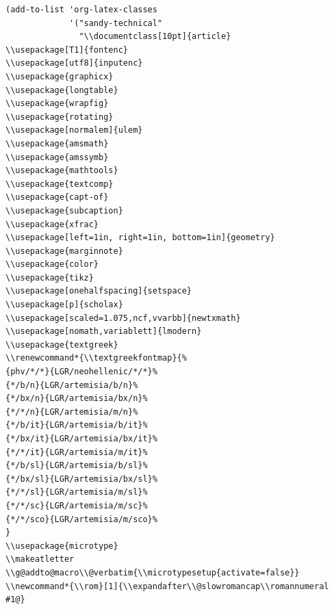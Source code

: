 \documentclass[10pt]{article}
\makeatletter
\renewcommand*{\textgreekfontmap}{%
{phv/*/*}{LGR/neohellenic/*/*}%
{*/b/n}{LGR/artemisia/b/n}%
{*/bx/n}{LGR/artemisia/bx/n}%
{*/*/n}{LGR/artemisia/m/n}%
{*/b/it}{LGR/artemisia/b/it}%
{*/bx/it}{LGR/artemisia/bx/it}%
{*/*/it}{LGR/artemisia/m/it}%
{*/b/sl}{LGR/artemisia/b/sl}%
{*/bx/sl}{LGR/artemisia/bx/sl}%
{*/*/sl}{LGR/artemisia/m/sl}%
{*/*/sc}{LGR/artemisia/m/sc}%
{*/*/sco}{LGR/artemisia/m/sco}%
}
\newcommand*{\rom}[1]{\expandafter\@slowromancap\romannumeral #1@}
\makeatother
\begin{document}
\begin{verbatim}
(add-to-list 'org-latex-classes
             '("sandy-technical"
               "\\documentclass[10pt]{article}
\\usepackage[T1]{fontenc}
\\usepackage[utf8]{inputenc}
\\usepackage{graphicx}
\\usepackage{longtable}
\\usepackage{wrapfig}
\\usepackage{rotating}
\\usepackage[normalem]{ulem}
\\usepackage{amsmath}
\\usepackage{amssymb}
\\usepackage{mathtools}
\\usepackage{textcomp}
\\usepackage{capt-of}
\\usepackage{subcaption}
\\usepackage{xfrac}
\\usepackage[left=1in, right=1in, bottom=1in]{geometry}
\\usepackage{marginnote}
\\usepackage{color}
\\usepackage{tikz}
\\usepackage[onehalfspacing]{setspace}
\\usepackage[p]{scholax}
\\usepackage[scaled=1.075,ncf,vvarbb]{newtxmath}
\\usepackage[nomath,variablett]{lmodern}
\\usepackage{textgreek}
\\renewcommand*{\\textgreekfontmap}{%
{phv/*/*}{LGR/neohellenic/*/*}%
{*/b/n}{LGR/artemisia/b/n}%
{*/bx/n}{LGR/artemisia/bx/n}%
{*/*/n}{LGR/artemisia/m/n}%
{*/b/it}{LGR/artemisia/b/it}%
{*/bx/it}{LGR/artemisia/bx/it}%
{*/*/it}{LGR/artemisia/m/it}%
{*/b/sl}{LGR/artemisia/b/sl}%
{*/bx/sl}{LGR/artemisia/bx/sl}%
{*/*/sl}{LGR/artemisia/m/sl}%
{*/*/sc}{LGR/artemisia/m/sc}%
{*/*/sco}{LGR/artemisia/m/sco}%
}
\\usepackage{microtype}
\\makeatletter
\\g@addto@macro\\@verbatim{\\microtypesetup{activate=false}}
\\newcommand*{\\rom}[1]{\\expandafter\\@slowromancap\\romannumeral #1@}

\end{verbatim}
\end{document}
